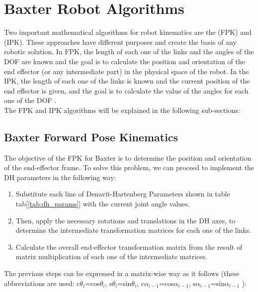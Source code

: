 \documentclass[11pt]{report} %
\begin{document}
\section{Baxter Robot Algorithms}

Two important mathematical algorithms for robot kinematics are the  (FPK) and  (IPK). These approaches have different purposes and create the basis of any robotic solution. In FPK, the length of each one of the links and the angles of the DOF are known and the goal is to calculate the position and orientation of the end effector (or any intermediate part) in the physical space of the robot. In the IPK, the length of each one of the links is known and the current position of the end effector is given, and the goal is to calculate the value of the angles for each one of the DOF \citep{cite_fpk_and_ipk_explained_simple}.\\

The FPK and IPK algorithms will be explained in the following sub-sections:

\subsection{Baxter Forward Pose Kinematics}

The objective of the FPK for Baxter is to determine the position and orientation of the end-effector frame. To solve this problem, we can proceed to implement the DH parameters in the following way:

\begin{enumerate}
    \item Substitute each line of Denavit-Hartenberg Parameters shown in table tab[\ref{tab:dh_params}] with the current joint angle values.
    \item Then, apply the necessary rotations and translations in the DH axes, to determine the intermediate transformation matrices for each one of the links.
    \item Calculate the overall end-effector transformation matrix from the result of matrix multiplication of each one of the intermediate matrices. 
\end{enumerate}

The previous steps can be expressed in a matrix-wise way as it follows (these abbreviations are used: c$\theta_{i}$=cos$\theta_{i}$, s$\theta_{i}$=sin$\theta_{i}$, c$\alpha_{i-1}$=cos$\alpha_{i-1}$, s$\alpha_{i-1}$=sin$\alpha_{i-1}$ ):
\end{document}
